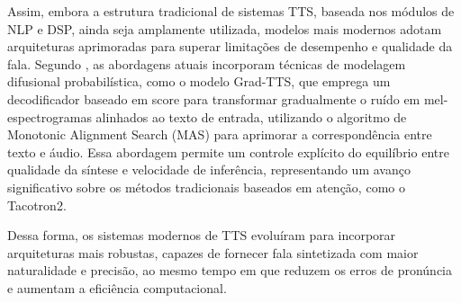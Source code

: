 Assim, embora a estrutura tradicional de sistemas TTS, baseada nos módulos de NLP e DSP, ainda seja amplamente utilizada, modelos mais modernos adotam arquiteturas aprimoradas para superar limitações de desempenho e qualidade da fala. Segundo , as abordagens atuais incorporam técnicas de modelagem difusional probabilística, como o modelo Grad-TTS, que emprega um decodificador baseado em score para transformar gradualmente o ruído em mel-espectrogramas alinhados ao texto de entrada, utilizando o algoritmo de Monotonic Alignment Search (MAS) para aprimorar a correspondência entre texto e áudio. Essa abordagem permite um controle explícito do equilíbrio entre qualidade da síntese e velocidade de inferência, representando um avanço significativo sobre os métodos tradicionais baseados em atenção, como o Tacotron2.

Dessa forma, os sistemas modernos de TTS evoluíram para incorporar arquiteturas mais robustas, capazes de fornecer fala sintetizada com maior naturalidade e precisão, ao mesmo tempo em que reduzem os erros de pronúncia e aumentam a eficiência computacional.